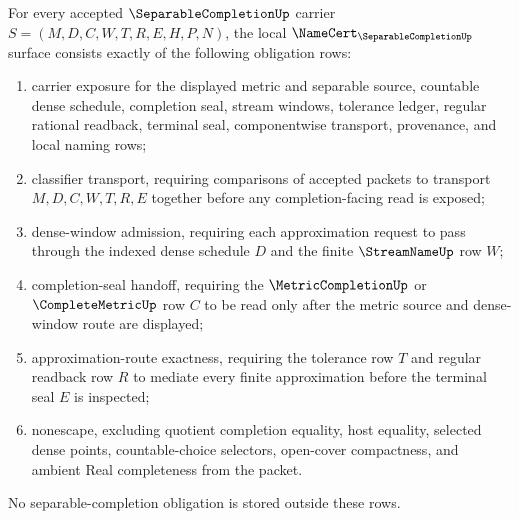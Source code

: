\begin{theorem}\label{thm:separable-completion-namecert-obligations}
For every accepted $\SeparableCompletionUp$ carrier $S=(M,D,C,W,T,R,E,H,P,N)$, the local $\NameCert_{\SeparableCompletionUp}$ surface consists exactly of the following obligation rows:
\begin{enumerate}
\item carrier exposure for the displayed metric and separable source, countable dense schedule, completion seal, stream windows, tolerance ledger, regular rational readback, terminal seal, componentwise transport, provenance, and local naming rows;
\item classifier transport, requiring comparisons of accepted packets to transport $M,D,C,W,T,R,E$ together before any completion-facing read is exposed;
\item dense-window admission, requiring each approximation request to pass through the indexed dense schedule $D$ and the finite $\StreamNameUp$ row $W$;
\item completion-seal handoff, requiring the $\MetricCompletionUp$ or $\CompleteMetricUp$ row $C$ to be read only after the metric source and dense-window route are displayed;
\item approximation-route exactness, requiring the tolerance row $T$ and regular readback row $R$ to mediate every finite approximation before the terminal seal $E$ is inspected;
\item nonescape, excluding quotient completion equality, host equality, selected dense points, countable-choice selectors, open-cover compactness, and ambient Real completeness from the packet.
\end{enumerate}
No separable-completion obligation is stored outside these rows.
\end{theorem}
